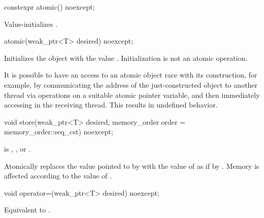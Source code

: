 %
\begin{itemdecl}
constexpr atomic() noexcept;
\end{itemdecl}

\begin{itemdescr}
\pnum
\effects
Value-initializes .
\end{itemdescr}

%
\begin{itemdecl}
atomic(weak_ptr<T> desired) noexcept;
\end{itemdecl}

\begin{itemdescr}
\pnum
\effects
Initializes the object with the value .
Initialization is not an atomic operation.
\begin{note}
It is possible to have an access to
an atomic object  race with its construction,
for example,
by communicating the address of the just-constructed object 
to another thread via  operations
on a suitable atomic pointer variable, and
then immediately accessing  in the receiving thread.
This results in undefined behavior.
\end{note}
\end{itemdescr}

%
\begin{itemdecl}
void store(weak_ptr<T> desired, memory_order order = memory_order::seq_cst) noexcept;
\end{itemdecl}

\begin{itemdescr}
\pnum
\expects
{} is
,
, or
.

\pnum
\effects
Atomically replaces the value pointed to by  with
the value of  as if by .
Memory is affected according to the value of .
\end{itemdescr}

%
\begin{itemdecl}
void operator=(weak_ptr<T> desired) noexcept;
\end{itemdecl}

\begin{itemdescr}
\pnum
\effects
Equivalent to .
\end{itemdescr}

